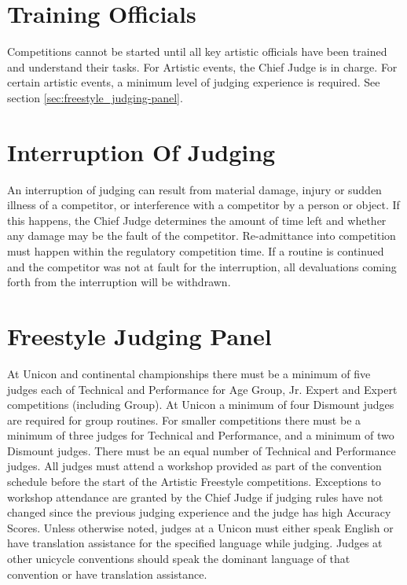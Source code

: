 \section{Training Officials}
Competitions cannot be started until all key artistic officials have been trained and understand their tasks.
For Artistic events, the Chief Judge is in charge.
For certain artistic events, a minimum level of judging experience is required.
See section \ref{sec:freestyle_judging-panel}.

\section{Interruption Of Judging}
An interruption of judging can result from material damage, injury or sudden illness of a competitor, or interference with a competitor by a person or object.
If this happens, the Chief Judge determines the amount of time left and whether any damage may be the fault of the competitor.
Re-admittance into competition must happen within the regulatory competition time.
If a routine is continued and the competitor was not at fault for the interruption, all devaluations coming forth from the interruption will be withdrawn.

\section{Freestyle Judging Panel \label{sec:freestyle_judging-panel}}
At Unicon and continental championships there must be a minimum of five judges each of Technical and Performance for Age Group, Jr. Expert and Expert competitions (including Group). %
At Unicon a minimum of four Dismount judges are required for group routines.
For smaller competitions there must be a minimum of three judges for Technical and Performance, and a minimum of two Dismount judges.
There must be an equal number of Technical and Performance judges.
All judges must attend a workshop provided as part of the convention schedule before the start of the Artistic Freestyle competitions.
Exceptions to workshop attendance are granted by the Chief Judge if judging rules have not changed since the previous judging experience and the judge has high Accuracy Scores.%
Unless otherwise noted, judges at a Unicon must either speak English or have translation assistance for the specified language while judging.
Judges at other unicycle conventions should speak the dominant language of that convention or have translation assistance.

